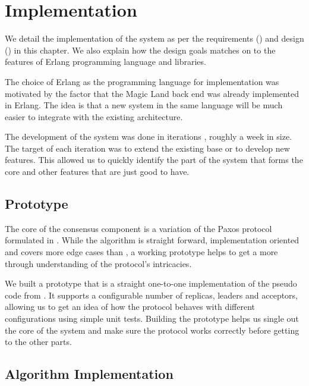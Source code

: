 \chapter{Implementation}
\label{chapter:implementation}

We detail the implementation of the system as per the requirements
() and
design () in this chapter. We also explain how the
design goals matches on to the features of Erlang programming
language and  libraries.

The choice of Erlang as the programming language for implementation was
motivated by the factor that the Magic Land back end was already implemented in
Erlang. The idea is that a new system in the same language will be much easier
to integrate with the existing architecture.

The development of the system was done in iterations%
, roughly a week in size.
The target of each iteration was to extend the existing base or to develop
new features. This allowed us to quickly identify the part of the system that
forms the core and other features that are just good to have.

\section{Prototype}

The core of the consensus component is a variation of
the Paxos protocol formulated in \citet{Robbert2011}. While
the algorithm is straight forward, implementation
oriented and covers more edge cases than \citet{Lamport01}, a working prototype
helps to get a more through understanding of the protocol's intricacies.

We built a prototype that is a straight one-to-one implementation of the
pseudo code from \citet{Robbert2011}. It supports a configurable number of
replicas, leaders and acceptors, allowing us to get an idea of how the protocol
behaves with different configurations using simple unit tests. Building the
prototype helps us single out the core of the system and make sure the
protocol works correctly before getting to the other parts.

\section{Algorithm Implementation}

